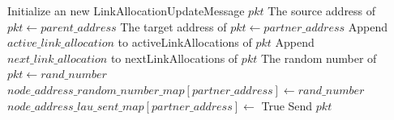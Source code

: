   \begin{algorithm}[H]                   
    \begin{algorithmic}[1]
        \State Initialize an new LinkAllocationUpdateMessage $pkt$
        \State The source address of $pkt \gets parent\_address$ 
        \State The target address of $pkt \gets partner\_address$ 
          \State Append $active\_link\_allocation$ to activeLinkAllocations of $pkt$
        \EndFor
          \State Append $next\_link\_allocation$ to nextLinkAllocations of $pkt$
        \EndFor
        \State The random number of $pkt \gets rand\_number$ 
        \State $node\_address\_random\_number\_map[partner\_address] \gets rand\_number$
        \State $node\_address\_lau\_sent\_map[partner\_address] \gets$ True
        \State Send $pkt$
      \EndFor
    \EndFor
  \EndFunction
  \end{algorithmic}
\end{algorithm}

